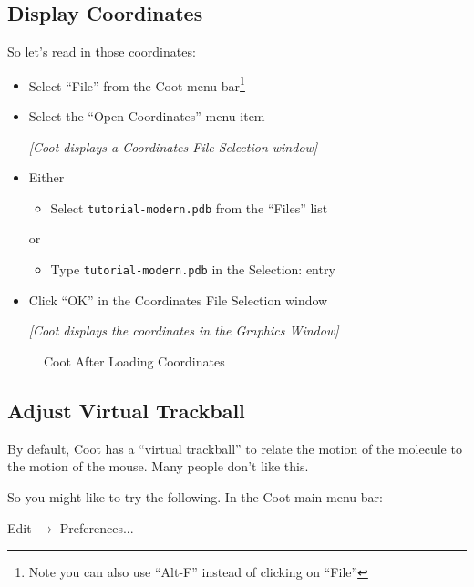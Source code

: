 \documentclass{article}
\begin{document}
\subsection{Display Coordinates}
So let's read in those coordinates:

\begin{itemize}
\item Select \textsf{``File''} from the Coot menu-bar\footnote{Note
    you can also use ``Alt-F'' instead of clicking on ``File''}
\item Select the \textsf{``Open Coordinates''} menu item

\textsl{  [Coot displays a Coordinates File Selection window]}

\item Either
  \begin{itemize}
  \item Select \texttt{tutorial-modern.pdb} from the ``Files'' list
  \end{itemize}
  or
  \begin{itemize}
  \item Type \texttt{tutorial-modern.pdb} in the Selection: entry
  \end{itemize}
\item Click \textsf{``OK''} in the Coordinates File Selection window

\textsl{  [Coot displays the coordinates in the Graphics Window]}

\end{itemize}

\begin{figure}[htbp]
  \begin{center}
    \leavevmode
    \epsfxsize 70mm
    \caption{Coot After Loading Coordinates}
    \label{fig:coordinates-coot}
  \end{center}
\end{figure}

\subsection{Adjust Virtual Trackball}
By default, Coot has a ``virtual trackball'' to relate the motion of
the molecule to the motion of the mouse.  Many people don't like this.

So you might like to try the following. In the Coot main menu-bar:

\textsf{Edit $\rightarrow$ Preferences...}
\end{document}

